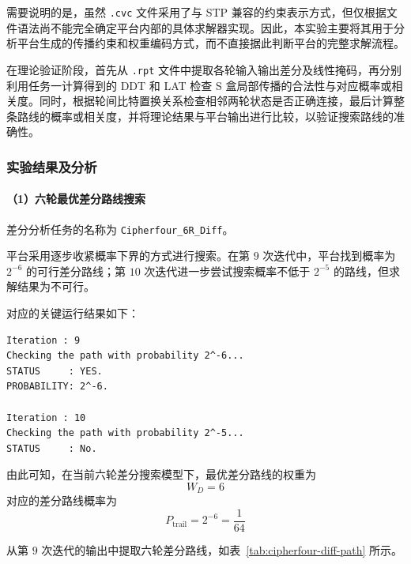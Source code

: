 需要说明的是，虽然 \texttt{.cvc} 文件采用了与 STP 兼容的约束表示方式，但仅根据文件语法尚不能完全确定平台内部的具体求解器实现。因此，本实验主要将其用于分析平台生成的传播约束和权重编码方式，而不直接据此判断平台的完整求解流程。

在理论验证阶段，首先从 \texttt{.rpt} 文件中提取各轮输入输出差分及线性掩码，再分别利用任务一计算得到的 DDT 和 LAT 检查 S 盒局部传播的合法性与对应概率或相关度。同时，根据轮间比特置换关系检查相邻两轮状态是否正确连接，最后计算整条路线的概率或相关度，并将理论结果与平台输出进行比较，以验证搜索路线的准确性。



\subsubsection{实验结果及分析}

\paragraph{（1）六轮最优差分路线搜索}

差分分析任务的名称为
\texttt{Cipherfour\_6R\_Diff}。

平台采用逐步收紧概率下界的方式进行搜索。在第 $9$ 次迭代中，平台找到概率为 $2^{-6}$ 的可行差分路线；第 $10$ 次迭代进一步尝试搜索概率不低于 $2^{-5}$ 的路线，但求解结果为不可行。

对应的关键运行结果如下：
\begin{verbatim}
Iteration : 9
Checking the path with probability 2^-6...
STATUS     : YES.
PROBABILITY: 2^-6.

Iteration : 10
Checking the path with probability 2^-5...
STATUS     : No.
\end{verbatim}

由此可知，在当前六轮差分搜索模型下，最优差分路线的权重为
\[
W_D=6
\]
对应的差分路线概率为
\[
P_{\mathrm{trail}}=2^{-6}=\frac{1}{64}
\]

从第 $9$ 次迭代的输出中提取六轮差分路线，如表~\ref{tab:cipherfour-diff-path} 所示。

